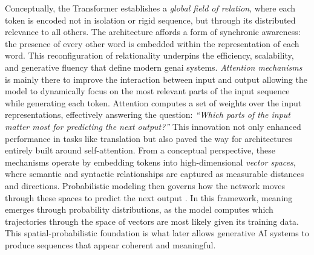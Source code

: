 Conceptually, the Transformer establishes a \emph{global field of relation},
where each token is encoded not in isolation or rigid sequence, but through its
distributed relevance to all others. The architecture affords a form of
synchronic awareness: the presence of every other word is embedded within the
representation of each word. This reconfiguration of relationality underpins the
efficiency, scalability, and generative fluency that define modern \gls{genai}
systems.
\emph{Attention mechanisms} is mainly there to improve the interaction between
input and output allowing the model to
dynamically focus on the most relevant parts of the input sequence while
generating each \gls{token}. Attention computes a set of weights over the input
representations, effectively answering the question:
\emph{“Which parts of the input matter most for predicting the next output?”}
This innovation not only enhanced performance in tasks like translation but
also paved the way for architectures entirely built around self-attention. From a conceptual perspective, these mechanisms operate by embedding tokens
into high-dimensional \emph{vector spaces}, where semantic and syntactic
relationships are captured as measurable distances and directions.
Probabilistic modeling then governs how the network moves through these spaces
to predict the next output \parencite[198]{montanari2025}. In this framework,
meaning emerges through probability distributions, as the
model computes which trajectories through the space of vectors are most
likely given its training data. This spatial-probabilistic foundation is what
later allows generative AI systems to produce sequences that appear coherent
and meaningful.


